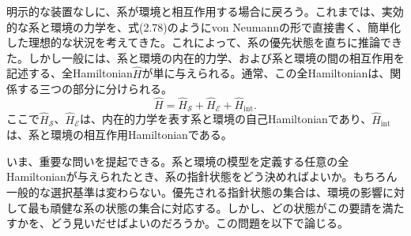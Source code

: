 明示的な装置なしに、系が環境と相互作用する場合に戻ろう。これまでは、実効的な系と環境の力学を、式(2.78)のようにvon Neumannの形で直接書く、簡単化した理想的な状況を考えてきた。これによって、系の優先状態を直ちに推論できた。しかし一般には、系と環境の内在的力学、および系と環境の間の相互作用を記述する、全Hamiltonian$\hat H$が単に与えられる。通常、この全Hamiltonianは、関係する三つの部分に分けられる。
\begin{equation}\hat H=\hat H_{\mathcal S}+\hat H_{\mathcal E}+\hat H_{\mathrm{int}}.\tag{2.85}\end{equation}
ここで$\hat H_{\mathcal S}$、$\hat H_{\mathcal E}$は、内在的力学を表す系と環境の自己Hamiltonianであり、$\hat H_{\mathrm{int}}$は、系と環境の相互作用Hamiltonianである。

いま、重要な問いを提起できる。系と環境の模型を定義する任意の全Hamiltonianが与えられたとき、系の指針状態をどう決めればよいか。もちろん一般的な選択基準は変わらない。優先される指針状態の集合は、環境の影響に対して最も頑健な系の状態の集合に対応する。しかし、どの状態がこの要請を満たすかを、どう見いだせばよいのだろうか。この問題を以下で論じる。
